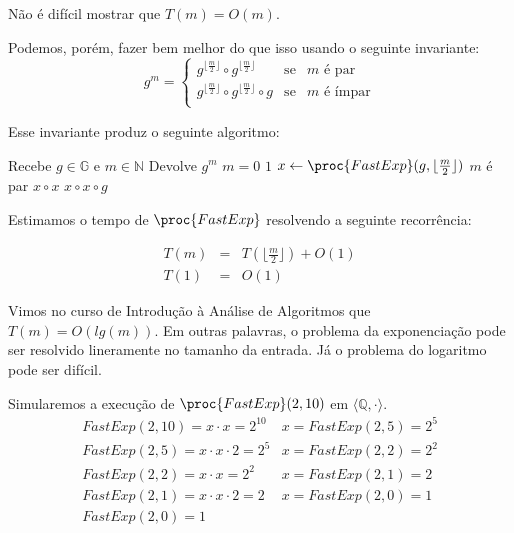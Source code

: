 Não é difícil mostrar que $T(m) = O(m)$.

Podemos, porém, fazer bem melhor do que isso usando o seguinte invariante:
\begin{displaymath}
  g^m = \left\{ 
    \begin{array}{lcl}
      g^{\lfloor \frac{m}{2} \rfloor} \circ  g^{\lfloor \frac{m}{2} \rfloor} & \textrm{se} & m \textrm{ é par}\\
      g^{\lfloor \frac{m}{2} \rfloor} \circ  g^{\lfloor \frac{m}{2} \rfloor} \circ g & \textrm{se} & m \textrm{ é ímpar}\\  
    \end{array}
    \right.
\end{displaymath}

Esse invariante produz o seguinte algoritmo:
\begin{codebox}
\li \Comment Recebe $g \in \mathbb{G}$ e $m \in \mathbb{N}$
\li \Comment Devolve $g^m$
\li \If $m = 0 $ 
\li \Then \Return $1$
\End
\li $x \gets \proc{FastExp}(g, \lfloor \frac{m}{2} \rfloor)$
\li \If $m$ é par
\li \Then \Return $x \circ x$
\li \Else \Return $x \circ x \circ g$
\End
\end{codebox}


Estimamos o tempo de $\proc{FastExp}$ resolvendo a seguinte recorrência:

\begin{eqnarray*}
  T(m) & = & T(\lfloor \frac{m}{2} \rfloor) + O(1)\\
  T(1) & = & O(1)
\end{eqnarray*}

Vimos no curso de Introdução à Análise de Algoritmos que $T(m) = O(lg(m))$.
Em outras palavras, o problema da exponenciação pode ser resolvido lineramente no tamanho da entrada.
Já o problema do logaritmo pode ser difícil.

\begin{example}
  Simularemos a execução de $\proc{FastExp}(2, 10)$ em $\langle \mathbb{Q}, \cdot \rangle$.
\begin{displaymath}
  \begin{array}{ll}
    FastExp(2, 10) = x \cdot x = 2^{10} & x = FastExp(2, 5) = 2^5 \\
    FastExp(2, 5)  = x \cdot x \cdot 2 = 2^5 & x = FastExp(2, 2) = 2^2\\
    FastExp(2, 2)  = x \cdot x = 2^2 & x = FastExp(2, 1) = 2\\
    FastExp(2, 1)  = x \cdot x \cdot 2 = 2 & x = FastExp(2, 0) = 1\\
    FastExp(2, 0)  = 1 \\
  \end{array}
\end{displaymath}
\end{example}

